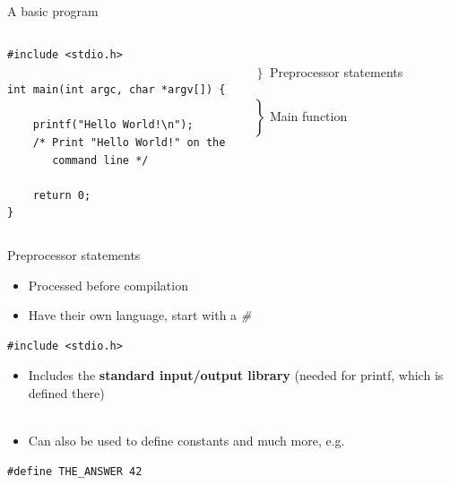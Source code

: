 \subsection{}
\begin{frame}[fragile]{A basic program}
	\begin{columns}[T]
		\begin{lstlisting}
#include <stdio.h>

int main(int argc, char *argv[]) {

	printf("Hello World!\n");
	/* Print "Hello World!" on the
	   command line */

	return 0;
}
\end{lstlisting}
		
		\ \\$\left. \begin{array}{c}\\\end{array}\right\rbrace $ Preprocessor statements
		\ \\\ \\$\left. \begin{array}{c}\\\\\\\\\\\\\end{array}\right\rbrace $ Main function
	\end{columns}
\end{frame}
\begin{frame}[fragile]{Preprocessor statements}	
	\begin{itemize}
		\item Processed before compilation
		\item Have their own language, start with a \textit{\#}
	\end{itemize}
	\begin{lstlisting}
#include <stdio.h>
\end{lstlisting}
	\begin{itemize}
		\item Includes the \textbf{standard input/output library} (needed for printf, which is defined there) \\ \ \\
		\item Can also be used to define constants and much more, e.g.
	\end{itemize}
\begin{lstlisting}[numbers=none]
#define THE_ANSWER 42
\end{lstlisting}
\end{frame}
